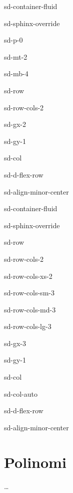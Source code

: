 \documentclass[letterpaper,10pt,english]{jupyterBook}
\begin{document}
\begin{sphinxuseclass}{sd-container-fluid}
\begin{sphinxuseclass}{sd-sphinx-override}
\begin{sphinxuseclass}{sd-p-0}
\begin{sphinxuseclass}{sd-mt-2}
\begin{sphinxuseclass}{sd-mb-4}
\begin{sphinxuseclass}{sd-row}
\begin{sphinxuseclass}{sd-row-cols-2}
\begin{sphinxuseclass}{sd-gx-2}
\begin{sphinxuseclass}{sd-gy-1}
\begin{sphinxuseclass}{sd-col}
\begin{sphinxuseclass}{sd-d-flex-row}
\begin{sphinxuseclass}{sd-align-minor-center}
\begin{sphinxuseclass}{sd-container-fluid}
\begin{sphinxuseclass}{sd-sphinx-override}
\begin{sphinxuseclass}{sd-row}
\begin{sphinxuseclass}{sd-row-cols-2}
\begin{sphinxuseclass}{sd-row-cols-xs-2}
\begin{sphinxuseclass}{sd-row-cols-sm-3}
\begin{sphinxuseclass}{sd-row-cols-md-3}
\begin{sphinxuseclass}{sd-row-cols-lg-3}
\begin{sphinxuseclass}{sd-gx-3}
\begin{sphinxuseclass}{sd-gy-1}
\begin{sphinxuseclass}{sd-col}
\begin{sphinxuseclass}{sd-col-auto}
\begin{sphinxuseclass}{sd-d-flex-row}
\begin{sphinxuseclass}{sd-align-minor-center}
\end{sphinxuseclass}
\end{sphinxuseclass}
\end{sphinxuseclass}
\end{sphinxuseclass}
\end{sphinxuseclass}
\end{sphinxuseclass}
\end{sphinxuseclass}
\end{sphinxuseclass}
\end{sphinxuseclass}
\end{sphinxuseclass}
\end{sphinxuseclass}
\end{sphinxuseclass}
\end{sphinxuseclass}
\end{sphinxuseclass}
\end{sphinxuseclass}
\end{sphinxuseclass}
\end{sphinxuseclass}
\end{sphinxuseclass}
\end{sphinxuseclass}
\end{sphinxuseclass}
\end{sphinxuseclass}
\end{sphinxuseclass}
\end{sphinxuseclass}
\end{sphinxuseclass}
\end{sphinxuseclass}
\end{sphinxuseclass}

\chapter{Polinomi}
\label{\detokenize{ch/precalculus/polynomials:polinomi}}\label{\detokenize{ch/precalculus/polynomials:math-hs-precalculus-polynomials}}\label{\detokenize{ch/precalculus/polynomials::doc}}
\sphinxAtStartPar
…
\end{document}
